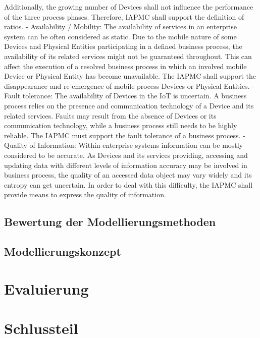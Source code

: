 \documentclass[a4paper, 12pt, twoside, headsepline=true]{scrartcl} %
\begin{document}
Additionally, the growing number of Devices shall not influence the performance of the three process phases. Therefore, IAPMC shall support the definition of ratios.
- Availability / Mobility: The availability of services in an enterprise system can be often considered as static. Due to the mobile nature of some Devices and Physical Entities participating in a defined business process, the availability of its related services might not be guaranteed throughout. This can affect the execution of a resolved business process in which an involved mobile Device or Physical Entity has become unavailable. The IAPMC shall support the disappearance and re-emergence of mobile process Devices or Physical Entities.
- Fault tolerance: The availability of Devices in the IoT is uncertain. A business process relies on the presence and communication technology of a Device and its related services. Faults may result from the absence of Devices or its communication technology, while a business process still needs to be highly reliable. The IAPMC must support the fault tolerance of a business process.
- Quality of Information: Within enterprise systems information can be mostly considered to be accurate. As Devices and its services providing, accessing and updating data with different levels of information accuracy may be involved in business process, the quality of an accessed data object may vary widely and its entropy can get uncertain. In order to deal with this difficulty, the IAPMC shall provide means to express the quality of information.

\cite{iotawareprocesses}

\subsection{Bewertung der Modellierungsmethoden}

\subsection{Modellierungskonzept}

\newpage

\section{Evaluierung}

\newpage

\section{Schlussteil}
\end{document}
